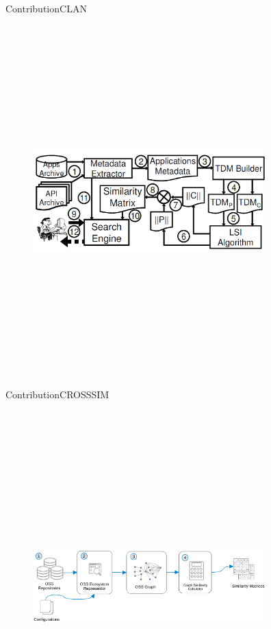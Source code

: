 \documentclass{beamer}
\begin{document}
\begin{frame}{Contribution}{CLAN}
	\begin{figure}[!h]
	\includegraphics[width=9cm,height=13.5cm,keepaspectratio]{images/Clan.png}
	\centering
	\label{fig:Clan}
	\end{figure}
\end{frame}

\begin{frame}{Contribution}{CROSSSIM}
	\begin{figure}[!h]
	\includegraphics[width=9cm,height=13.5cm,keepaspectratio]{images/CrossSim.pdf}
	\centering
	\label{fig:CrossSim}
	\end{figure}
\end{frame}
\end{document}
